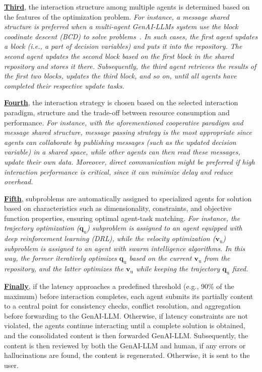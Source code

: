 \documentclass[twoside,11pt]{reviewresponse}
\theoremstyle{plain}
\theoremstyle{plain}
\begin{document}
\par \textbf{\ul{Third}}, the interaction structure among multiple agents is determined based on the features of the optimization problem. \textit{For instance, a message shared structure is preferred when a multi-agent GenAI-LLMs system use the block coodinate descent (BCD) to solve problems~\cite{BCD}. In such cases, the first agent updates a block (i.e., a part of decision variables) and puts it into the repository. The second agent updates the second block based on the first block in the shared repository and stores it there. Subsequently, the third agent retrieves the results of the first two blocks, updates the third block, and so on, until all agents have completed their respective update tasks.}

\par \textbf{\ul{Fourth}}, the interaction strategy is chosen based on the selected interaction paradigm, structure and the trade-off between resource consumption and performance. \textit{For instance, with the aforementioned cooperative paradigm and message shared structure, message passing strategy is the most appropriate since agents can collaborate by publishing messages (such as the updated decision variable) in a shared space, while other agents can then read these messages, update their own data. Moreover, direct communication might be preferred if high interaction performance is critical, since it can minimize delay and reduce overhead.}

\par \textbf{\ul{Fifth}}, subproblems are automatically assigned to specialized agents for solution based on characteristics such as dimensionality, constraints, and objective function properties, ensuring optimal agent-task matching. \textit{For instance, the trajectory optimization ($\mathbf{q}_{\mathrm{u}}$) subproblem is assigned to an agent equipped with deep reinforcement learning (DRL), while the velocity optimization ($\mathbf{v}_{\mathrm{u}}$) subproblem is assigned to an agent with swarm intelligence algorithms. In this way, the former iteratively optimizes $\mathbf{q}_{\mathrm{u}}$ based on the current $\mathbf{v}_{\mathrm{u}}$ from the repository, and the latter optimizes the $\mathbf{v}_{\mathrm{u}}$ while keeping the trajectory $\mathbf{q}_{\mathrm{u}}$ fixed.}

\par \textbf{\ul{Finally}}, if the latency approaches a predefined threshold (e.g., 90\% of the maximum) before interaction completes, each agent submits its partially content to a central point for consistency checks, conflict resolution, and aggregation before forwarding to the GenAI-LLM. Otherwise, if latency constraints are not violated, the agents continue interacting until a complete solution is obtained, and the consolidated content is then forwarded GenAI-LLM. Subsequently, the content is then reviewed by both the GenAI-LLM and human, if any errors or hallucinations are found, the content is regenerated. Otherwise, it is sent to the user.
\end{document}
